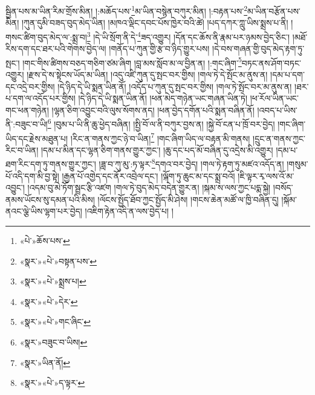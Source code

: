 སྦྱིན་པས་མ་ཡིན་རིམ་གྲོས་མིན། །:མཆོད་པས་\footnote{«པེ་»ཆོས་པས་}མ་ཡིན་བསྙེན་བཀུར་མིན། །:བརྟན་པས་\footnote{«སྣར་»«པེ་»བསྟན་པས་}མ་ཡིན་བརྩོན་པས་མིན། །ཀུན་དུམི་བཟད་བུད་མེད་ཡིན། །མཁའ་ལྡིང་དབང་པོས་ཁྱེར་བའི་ཚེ། །པད་དཀར་ཀླུ་ཡིས་སྨྲས་པ་ནི། །གསང་ཚིག་བུད་མེད་ལ་:སྨྲ་བ།\footnote{«སྣར་»«པེ་»སྨྲས་པ།} །དེ་ཡི་སྲོག་ནི་དེ་\footnote{«སྣར་»«པེ་»དེར་}ཟད་འགྱུར། །དོན་དང་ཆོས་ནི་རྣམ་པར་ཉམས་བྱེད་ཅིང་། །མཐོ་རིས་དག་དང་ཐར་པའི་གེགས་བྱེད་ལ། །གནོད་པ་ཀུན་གྱི་རྩ་བ་ཉིད་གྱུར་པས། །དེ་བས་གཞན་གྱི་བུད་མེད་རྟག་ཏུ་སྤང་། །གང་གིས་ཚིགས་བཅད་གཅིག་ཙམ་ཞིག །བླ་མས་སློབ་མ་ལ་བྱིན་ན། །:གང་ཞིག་\footnote{«སྣར་»«པེ་»གང་ཞིང་}བཏང་ནས་ཤོག་བཏང་འགྱུར། །རྫས་དེ་ས་སྟེངས་ཡོད་མ་ཡིན། །འདུ་འཛི་ཀུན་དུ་སྤང་བར་གྱིས། །གལ་ཏེ་དེ་སྤོང་མ་ནུས་ན། །དམ་པ་དག་དང་འདྲེ་བར་གྱིས། །དེ་ཉིད་དེ་ཡི་སྨན་ཡིན་ནོ། །འདོད་པ་ཀུན་དུ་སྤང་བར་གྱིས། །གལ་ཏེ་སྤོང་བར་མ་ནུས་ན། །ཐར་པ་དག་ལ་འདོད་པར་གྱིས། །དེ་ཉིད་དེ་ཡི་སྨན་ཡིན་ནོ། །ཕན་མེད་གཉེན་ཡང་གཞན་ཡིན་ཏེ། །ཕ་རོལ་ཡིན་ཡང་གང་ཕན་གཉེན། །ལྷན་ཅིག་འབྱུང་བའི་ལུས་སོགས་ནད། །ཕན་བྱེད་དགོན་པའི་སྨན་བཞིན་ནོ། །འབད་པ་ཡིས་ནི་:བཟུང་བ་ཡི།\footnote{«སྣར་»བཟུང་བ་ཡིས།} །བུམ་པ་ཡི་ནི་ཆུ་ཕྱེད་བཞིན། །སྤྱི་བོ་ལ་ནི་བཀུར་བྱས་ན། །སྐྱེ་བོ་ངན་པ་ཁྲོ་བར་བྱེད། །གང་ཞིག་ཡིད་དང་རྗེས་མཐུན་པ། །རིང་ན་གནས་ཀྱང་ཉེ་བ་ཡིན།\footnote{«སྣར་»ཡིན་ནོ།} །གང་ཞིག་ཡིད་ལ་བརྟན་མི་གནས། །དྲུང་ན་གནས་ཀྱང་རིང་བ་ཡིན། །དམ་པ་མིན་དང་ལྷན་ཅིག་གནས་གྱུར་ཀྱང་། །ཆུ་དང་པད་མོ་བཞིན་དུ་འདྲེས་མི་འགྱུར། །དམ་པ་ཐག་རིང་དག་ཏུ་གནས་གྱུར་ཀྱང་། །ཟླ་བ་ཀུ་མུ་:ཏ་ལྟར་\footnote{«སྣར་»«པེ་»ད་ལྟར་}དགའ་བར་བྱེད། །གལ་ཏེ་རྟག་ཏུ་མཛའ་འདོད་ན། །གསུམ་པོ་འདི་དག་མི་བྱ་སྟེ། །རྒྱན་པོ་འགྱེད་དང་ནོར་འབྲེལ་དང་། །ལྐོག་ཏུ་ཆུང་མ་དང་སྨྲ་བའོ། །ཇི་ལྟར་རྭ་ལས་འོ་མ་འབྱུང་། །འདམ་བུ་མེ་ཏོག་སྦྲང་རྩི་འཛག །གལ་ཏེ་བུད་མེད་བདེན་གྱུར་ན། །སྐམ་ས་ལས་ཀྱང་པདྨ་སྐྱེ། །བསོད་ནམས་ཡོངས་སུ་དམན་པའི་མིས། །ལོངས་སྤྱོད་ཐོབ་ཀྱང་སྤྱོད་མི་ཤེས། །གངས་ཆེན་མཚོ་ལ་ཁྱི་བཞིན་དུ། །སྐོམ་ནའང་ལྕེ་ཡིས་ལྷག་པར་བྱེད། །འཇིག་རྟེན་འདི་ན་ལས་བྱེད་པ། །
